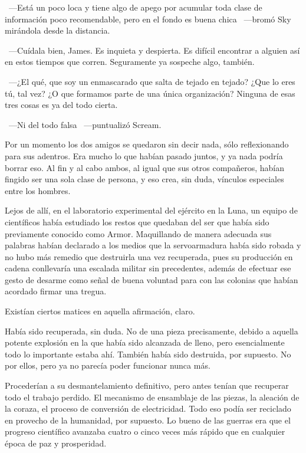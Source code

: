 ~---Está un poco loca y tiene algo de apego por acumular toda clase de información poco recomendable, pero en el fondo es buena chica ~---bromó Sky mirándola desde la distancia.

~---Cuídala bien, James. Es inquieta y despierta. Es difícil encontrar a alguien así en estos tiempos que corren. Seguramente ya sospeche algo, también.

~---¿El qué, que soy un enmascarado que salta de tejado en tejado? ¿Que lo eres tú, tal vez? ¿O que formamos parte de una única organización? Ninguna de esas tres cosas es ya del todo cierta.

~---Ni del todo falsa ~---puntualizó Scream.

Por un momento los dos amigos se quedaron sin decir nada, sólo reflexionando para sus adentros. Era mucho lo que habían pasado juntos, y ya nada podría borrar eso. Al fin y al cabo ambos, al igual que sus otros compañeros, habían fingido ser una sola clase de persona, y eso crea, sin duda, vínculos especiales entre los hombres.

\parbreak
Lejos de allí, en el laboratorio experimental del ejército en la Luna, un equipo de científicos había estudiado los restos que quedaban del ser que había sido previamente conocido como Armor. Maquillando de manera adecuada sus palabras habían declarado a los medios que la servoarmadura había sido robada y no hubo más remedio que destruirla una vez recuperada, pues su producción en cadena conllevaría una escalada militar sin precedentes, además de efectuar ese gesto de desarme como señal de buena voluntad para con las colonias que habían acordado firmar una tregua.

Existían ciertos matices en aquella afirmación, claro.

Había sido recuperada, sin duda. No de una pieza precisamente, debido a aquella potente explosión en la que había sido alcanzada de lleno, pero esencialmente todo lo importante estaba ahí. También había sido destruida, por supuesto. No por ellos, pero ya no parecía poder funcionar nunca más.

Procederían a su desmantelamiento definitivo, pero antes tenían que recuperar todo el trabajo perdido. El mecanismo de ensamblaje de las piezas, la aleación de la coraza, el proceso de conversión de electricidad. Todo eso podía ser reciclado en provecho de la humanidad, por supuesto. Lo bueno de las guerras era que el progreso científico avanzaba cuatro o cinco veces más rápido que en cualquier época de paz y prosperidad.

